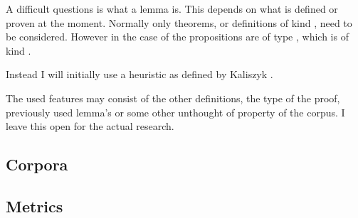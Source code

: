 A difficult questions is what a lemma is.
This depends on what is defined or proven at the moment.
Normally only theorems, or definitions of kind \prop, need to be considered.
However in the case of \corn the propositions are of type \cprop, which is of kind \kindtype.

Instead I will initially use a heuristic as defined by Kaliszyk \cite{kaliszyk2014machine}.

The used features may consist of the other definitions, the type of the proof, previously used lemma's
or some other unthought of property of the corpus.
I leave this open for the actual research. 

\subsection{Corpora}
\begin{description}
    \item[\compcert]
    \item[\formalin]
    \item[\corn]
    \item[\mathcomp]
\end{description}

\subsection{Metrics}
